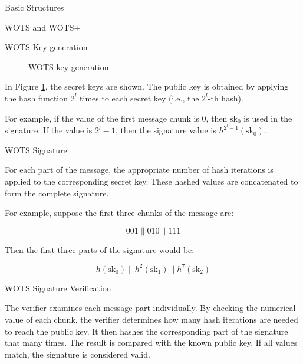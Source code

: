 \begin{section}{Basic Structures}
\begin{subsection}{WOTS and WOTS+}
\begin{subsubsection}{WOTS Key generation}
\begin{figure}
			 \caption{WOTS key generation}
			 \label{fig:WOTS}
		 \end{figure}

		 In Figure \ref{fig:WOTS}, the secret keys are shown. The public key is obtained by applying the hash function \( 2^l \) times to each secret key (i.e., the \( 2^l \)-th hash).

		 For example, if the value of the first message chunk is 0, then \(\text{sk}_0\) is used in the signature. If the value is \( 2^l - 1 \), then the signature value is \( h^{2^l - 1}(\text{sk}_0) \).


	 \end{subsubsection}

	 \begin{subsubsection}{WOTS Signature}

		 For each part of the message, the appropriate number of hash iterations is applied to the corresponding secret key. These hashed values are concatenated to form the complete signature.

		 For example, suppose the first three chunks of the message are:

		 \[
			 001 \| 010 \| 111
		 \]

		 Then the first three parts of the signature would be:

		 \[
			 h(\text{sk}_0) \| h^2(\text{sk}_1) \| h^7(\text{sk}_2)
		 \]

	 \end{subsubsection}

	 \begin{subsubsection}{WOTS Signature Verification}

		 The verifier examines each message part individually. By checking the numerical value of each chunk, the verifier determines how many hash iterations are needed to reach the public key. It then hashes the corresponding part of the signature that many times. The result is compared with the known public key. If all values match, the signature is considered valid.


\end{subsubsection}
\end{subsection}
\end{section}
